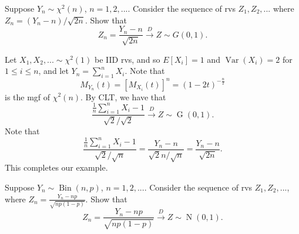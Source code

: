 \documentclass[notoc,notitlepage]{tufte-book}
\DeclareMathOperator{\Bin}{Bin }
\DeclareMathOperator{\Nor}{N }
\DeclareMathOperator{\Gau}{G }
\DeclareMathOperator{\Var}{Var }
\newcommand{\convd}{\overset{D}{\to}}
\begin{document}
\begin{eg}
  Suppose $Y_n \sim \chi^2(n)$, $n = 1, 2, ...$. Consider the sequence of rvs $Z_1, Z_2,...$ where $Z_n = (Y_n - n) / \sqrt{2n}$. Show that
  \begin{equation*}
    Z_n = \frac{Y_n - n}{\sqrt{2n}} \convd Z \sim G(0, 1).
  \end{equation*}
\end{eg}

\begin{solution}
   Let $X_1, X_2, ... \sim \chi^2(1)$ be IID rvs, and so $E[X_i] = 1$ and $\Var(X_i) = 2$ for $1 \leq i \leq n$, and let $Y_n = \sum_{i=1}^{n} X_i$. Note that
  \begin{equation*}
    M_{Y_n}(t) = [ M_{X_i}(t) ]^n = (1 - 2t)^{-\frac{n}{2}}
  \end{equation*}
  is the mgf of $\chi^2 (n)$. By CLT, we have that
  \begin{equation*}
    \frac{\frac{1}{n} \sum_{i=1}^{n} X_i - 1}{\sqrt{2} / \sqrt{2}} \convd Z \sim \Gau(0, 1).
  \end{equation*}
  Note that
  \begin{equation*}
    \frac{\frac{1}{n} \sum_{i=1}^{n} X_i - 1}{\sqrt{2} / \sqrt{n}} = \frac{Y_n - n}{\sqrt{2} n / \sqrt{n}} = \frac{Y_n - n}{\sqrt{2n}}.
  \end{equation*}
  This completes our example.
\end{solution}

\begin{eg}
  Suppose $Y_n \sim \Bin(n, p)$, $n = 1, 2, ...$. Consider the sequence of rvs $Z_1, Z_2, ...$, where $Z_n = \frac{Y_n - np}{\sqrt{np(1 - p)}}$. Show that
  \begin{equation*}
    Z_n = \frac{Y_n - np}{\sqrt{np(1 - p)}} \convd Z \sim \Nor(0, 1).
  \end{equation*}
\end{eg}
\end{document}
